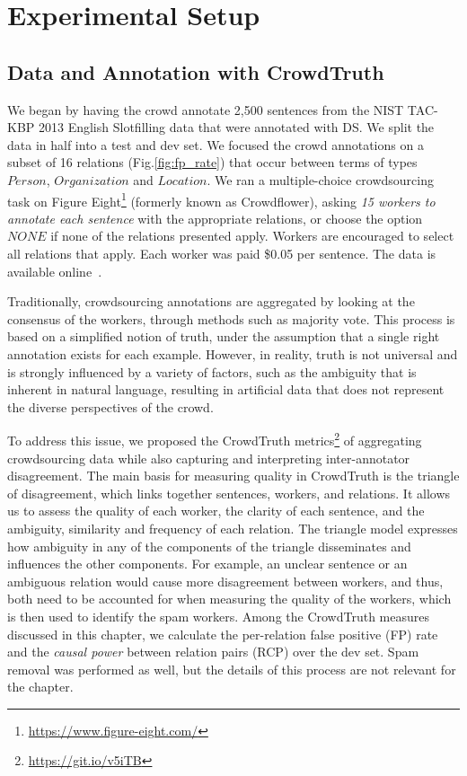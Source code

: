 \section{Experimental Setup}

\subsection{Data and Annotation with CrowdTruth}


We began by having the crowd annotate 2,500 sentences from the NIST TAC-KBP 2013 English Slotfilling data that were annotated with DS.  We split the data in half into a test and dev set. We focused the crowd annotations on a subset of 16 relations (Fig.\ref{fig:fp_rate}) that occur between terms of types $Person$, $Organization$ and $Location$. We ran a multiple-choice crowdsourcing task on Figure Eight\footnote{\url{https://www.figure-eight.com/}} (formerly known as Crowdflower), asking {\em 15 workers to annotate each sentence} with the appropriate relations, or choose the option $NONE$ if none of the relations presented apply. Workers are encouraged to select all relations that apply. Each worker was paid \$0.05 per sentence. The data is available online~\cite{crowdODrelexdata2016}. 

Traditionally, crowdsourcing annotations are aggregated by looking at the consensus of the workers, through methods such as majority vote. This process is based on a simplified notion of truth, under the assumption that a single right annotation exists for each example. However, in reality, truth is not universal and is strongly influenced by a variety of factors, such as the ambiguity that is inherent in natural language, resulting in artificial data that does not represent the diverse perspectives of the crowd.

To address this issue, we proposed the CrowdTruth metrics\footnote{\url{https://git.io/v5iTB}} of aggregating crowdsourcing data while also capturing and interpreting inter-annotator disagreement. The main basis for measuring quality in CrowdTruth is the triangle of disagreement, which links together sentences, workers, and relations. It allows us to assess the quality of each worker, the clarity of each sentence, and the ambiguity, similarity and frequency of each relation. The triangle model expresses how ambiguity in any of the components of the triangle disseminates and influences the other components. For example, an unclear sentence or an ambiguous relation would cause more disagreement between workers, and thus, both need to be accounted for when measuring the quality of the workers, which is then used to identify the spam workers. Among the CrowdTruth measures discussed in this chapter, we calculate the per-relation false positive (FP) rate and the \textit{causal power} between relation pairs (RCP) over the dev set. Spam removal was performed as well, but the details of this process are not relevant for the chapter.


